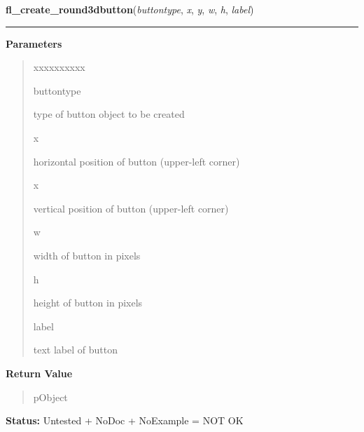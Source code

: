     \label{xformslib:library:fl_create_round3dbutton}

    \vspace{0.5ex}

\hspace{.8\funcindent}\begin{boxedminipage}{\funcwidth}

    \raggedright \textbf{fl\_create\_round3dbutton}(\textit{buttontype}, \textit{x}, \textit{y}, \textit{w}, \textit{h}, \textit{label})

    \vspace{-1.5ex}

    \rule{\textwidth}{0.5\fboxrule}
\setlength{\parskip}{2ex}
\setlength{\parskip}{1ex}
      \textbf{Parameters}
      \vspace{-1ex}

      \begin{quote}
        \begin{Ventry}{xxxxxxxxxx}

          \item[buttontype]

          type of button object to be created

          \item[x]

          horizontal position of button (upper-left corner)

          \item[x]

          vertical position of button (upper-left corner)

          \item[w]

          width of button in pixels

          \item[h]

          height of button in pixels

          \item[label]

          text label of button

        \end{Ventry}

      \end{quote}

      \textbf{Return Value}
    \vspace{-1ex}

      \begin{quote}
      pObject

      \end{quote}

\textbf{Status:} Untested + NoDoc + NoExample = NOT OK



    \end{boxedminipage}

